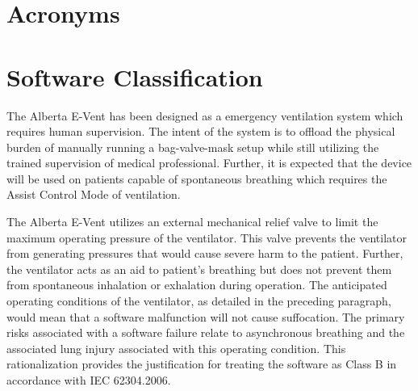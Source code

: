 \documentclass[]{article}
\begin{document}
\clearpage

\section{Acronyms}

\begin{acronym}
	
	
	
	
	
	
	
	
\end{acronym}


\clearpage

\section{Software Classification}
\label{sect:software_class}
The Alberta E-Vent has been designed as a emergency ventilation system which requires human supervision. The intent of the system is to offload the physical burden of manually running a bag-valve-mask setup while still utilizing the trained supervision of medical professional. Further, it is expected that the device will be used on patients capable of spontaneous breathing which requires the Assist Control Mode of ventilation.

The Alberta E-Vent utilizes an external mechanical relief valve to limit the maximum operating pressure of the ventilator.  This valve prevents the ventilator from generating pressures that would cause severe harm to the patient.  Further, the ventilator acts as an aid to patient's breathing but does not prevent them from spontaneous inhalation or exhalation during operation.  The anticipated operating conditions of the ventilator, as detailed in the preceding paragraph, would mean that a software malfunction will not cause suffocation.  The primary risks associated with a software failure relate to asynchronous breathing and the associated lung injury associated with this operating condition.  This rationalization provides the justification for treating the software as Class B in accordance with IEC 62304.2006.
\end{document}

